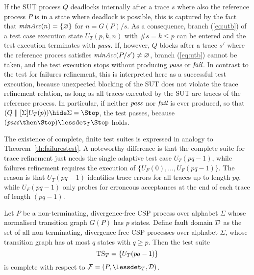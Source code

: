 If the SUT process $Q$ deadlocks internally after a trace $s$ where also the reference
process $P$ is in a state where deadlock is possible, this is captured by the fact
that $\text{\it minAcc}(n) = \{ \varnothing\}$ for $n = G(P)/s$. As a consequence, branch
(\ref{eq:utb}) of a test case execution state $U_T(p,k,n)$  
with $\#s = k \le p$   can be entered
and the  test execution terminates with ${\text{\it pass}}$. If, however,  
$Q$ blocks after a trace $s'$
where the reference process satisfies $\text{\it minAcc}(P/s') \neq\varnothing$, branch 
(\ref{eq:utb})  cannot be taken, and the test execution stops without producing
${\text{\it pass}}$ or ${\text{\it fail}}$. In contrast to the test for failures refinement, this is   interpreted here as a successful test execution, because unexpected blocking
of the SUT does not violate the trace refinement relation, as long as all traces 
executed by the SUT are traces of the reference process. In particular, if 
neither ${\text{\it pass}}$ nor ${\text{\it fail}}$ is ever produced, so that
$(Q\parallel[\Sigma] U_T(p)) \hide \Sigma = \Stop$, the test passes, because
$(\epass\then\Stop) \lessdet_T \Stop$ holds.



The existence of complete, finite test suites is expressed in analogy to
Theorem~\ref{th:failurestest}. A noteworthy difference is that the complete
suite for trace refinement just needs the single adaptive test case
$U_T(pq-1)$, while failures refinement requires the execution of $\{
U_F(0),\dots,U_F(pq-1)\}$. The reason is that $U_T(pq-1)$ identifies trace
errors for all traces up to length $pq$, while $U_F(pq-1)$ only probes for
erroneous acceptances at the end of each trace of length $(pq -1)$. 
%
\begin{theorem}\label{th:tracetest}
Let $P$ be a non-terminating, divergence-free CSP process over alphabet $\Sigma$ whose
normalised transition graph $G(P)$ has $p$ states. Define fault domain ${\cal
D}$ as the set of all non-terminating, divergence-free CSP processes over alphabet $\Sigma$,
whose transition graph has at most $q$ states with $q \ge p$. Then the test
suite
\[
{\text{TS}}_T = \{ U_T(pq-1)   \}
\]
is complete with respect to ${\cal F} = (P,\lessdet_T,{\cal D})$.
\xbox
\end{theorem}

